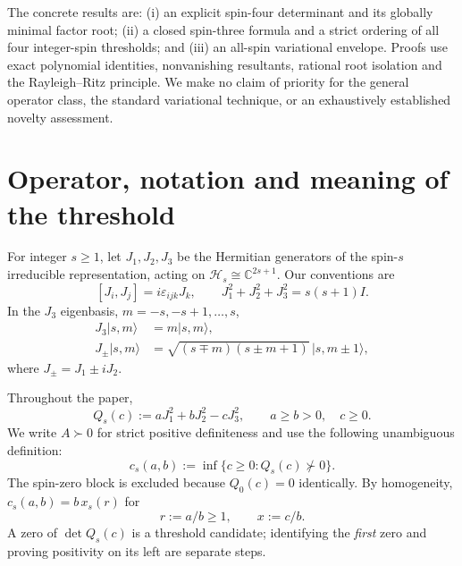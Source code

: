 \documentclass[11pt,a4paper]{article}
\begin{document}
The concrete results are: (i) an explicit spin-four determinant and its
globally minimal factor root; (ii) a closed spin-three formula and a
strict ordering of all four integer-spin thresholds; and (iii) an
all-spin variational envelope. Proofs use exact polynomial identities,
nonvanishing resultants, rational root isolation and the
Rayleigh--Ritz principle. We make no claim of priority for the general operator class,
the standard variational technique, or an exhaustively established
novelty assessment.

\section{Operator, notation and meaning of the threshold}\label{sec:setup}
For integer $s\geq1$, let $J_1,J_2,J_3$ be the Hermitian generators
of the spin-$s$ irreducible representation, acting on
$\mathcal H_s\cong\mathbb C^{2s+1}$. Our conventions are
\begin{equation}\label{eq:su2}
[J_i,J_j]=i\varepsilon_{ijk}J_k,\qquad
J_1^2+J_2^2+J_3^2=s(s+1)I.
\end{equation}
In the $J_3$ eigenbasis, $m=-s,-s+1,\ldots,s$,
\begin{align}
J_3|s,m\rangle&=m|s,m\rangle,\label{eq:z}\\
J_\pm|s,m\rangle&=\sqrt{(s\mp m)(s\pm m+1)}
\,|s,m\pm1\rangle,\label{eq:ladder}
\end{align}
where $J_\pm=J_1\pm iJ_2$.

Throughout the paper,
\begin{equation}\label{eq:Q}
Q_s(c):=aJ_1^2+bJ_2^2-cJ_3^2,
\qquad a\geq b>0,\quad c\geq0.
\end{equation}
We write $A\succ0$ for strict positive definiteness and use the
following unambiguous definition:
\begin{equation}\label{eq:thresholddef}
c_s(a,b):=\inf\{c\geq0:Q_s(c)\not\succ0\}.
\end{equation}
The spin-zero block is excluded because $Q_0(c)=0$ identically.
By homogeneity, $c_s(a,b)=b\,x_s(r)$ for
\begin{equation}\label{eq:scaling}
r:=a/b\geq1,\qquad x:=c/b.
\end{equation}
A zero of $\det Q_s(c)$ is a threshold candidate; identifying the
\emph{first} zero and proving positivity on its left are separate steps.
\end{document}
